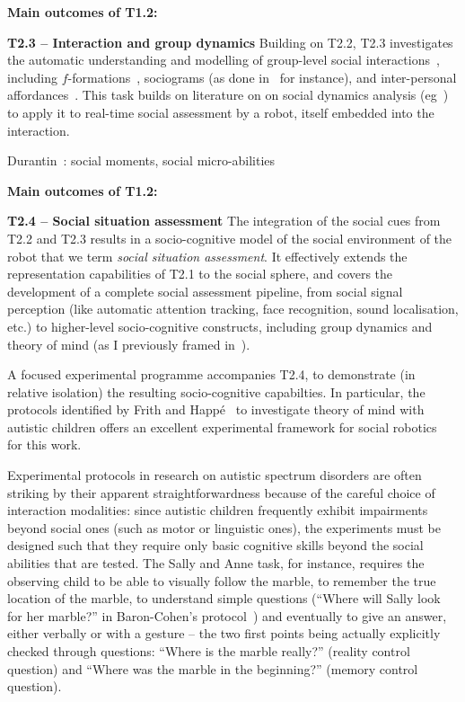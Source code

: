 \documentclass[11pt,a4paper]{report}
\begin{document}
\begin{framed}
    {\bf Main outcomes of T1.2:}
\end{framed}

\textbf{T2.3 -- Interaction and group dynamics} Building on T2.2, T2.3
investigates the automatic understanding and modelling of group-level social
interactions~\cite{tapus2019perceiving}, including
$f$-formations~\cite{marshall2011using}, sociograms (as done
in~\cite{garcia2016hybrid} for instance), and inter-personal
affordances~\cite{pandey2013affordance}. This task builds on literature on on
social dynamics analysis (eg~\cite{durantin2017social,jermann2009physical,
martinez2019collocated}) to apply it to real-time social assessment by a robot,
itself embedded into the interaction.


Durantin~\cite{durantin2017social}: social moments, social micro-abilities


\begin{framed}
    {\bf Main outcomes of T1.2:}
\end{framed}


\textbf{T2.4 -- Social situation assessment} The integration of the social cues
from T2.2 and T2.3 results in a socio-cognitive model of the social environment
of the robot that we term \emph{social situation assessment}.  It effectively
extends the representation capabilities of T2.1 to the social sphere, and covers
the development of a complete social assessment pipeline, from social signal
perception (like automatic attention tracking, face recognition, sound
localisation, etc.) to higher-level socio-cognitive constructs, including group
dynamics and theory of mind (as I previously framed
in~\cite{lemaignan2015mutual, dillenbourg2016symmetry}).


A focused experimental
programme accompanies T2.4, to demonstrate (in relative isolation) the resulting
socio-cognitive capabilties. In particular, the protocols identified by Frith
and Happé~\cite{frith1994autism} to investigate theory of mind with autistic
children offers an excellent experimental framework for social
robotics~\cite{lemaignan2015mutual} for this work.

Experimental protocols in research on autistic spectrum disorders are often
striking by their apparent straightforwardness because of the careful choice of
interaction modalities: since autistic children frequently exhibit impairments
beyond social ones (such as motor or linguistic ones), the experiments must be
designed such that they require only basic cognitive skills beyond the social
abilities that are tested. The Sally and Anne task, for instance, requires the
observing child to be able to visually follow the marble, to remember the true
location of the marble, to understand simple questions (``Where will Sally look
for her marble?'' in Baron-Cohen's protocol~\cite{baron1985does}) and eventually
to give an answer, either verbally or with a gesture -- the two first points
being actually explicitly checked through questions: ``Where is the marble
really?'' (reality control question) and ``Where was the marble in the
beginning?'' (memory control question).
\end{document}
